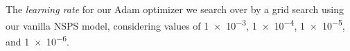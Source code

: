 \documentclass{article}
\begin{document}



The \emph{learning rate} for our Adam optimizer we search over
by a grid search using our vanilla NSPS model, considering
values of \num{1e-3}, \num{1e-4}, \num{1e-5}, and \num{1e-6}.
\end{document}
